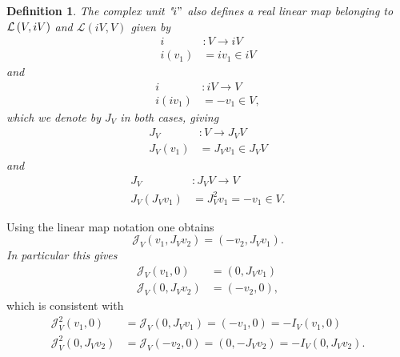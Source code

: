 \documentclass[aps,preprint]{revtex4}
\newtheorem{definition}[theorem]{Definition}
\begin{document}
\begin{definition}
The complex unit "$i"$ also defines a real linear map belonging to $\mathcal{%
L}\left( V,iV\right) $ and $\mathcal{L}\left( iV,V\right) $ given by 
\begin{align}
i& :V\rightarrow iV \\
i\left( v_{1}\right) & =iv_{1}\in iV
\end{align}%
and%
\begin{align}
i& :iV\rightarrow V \\
i\left( iv_{1}\right) & =-v_{1}\in V,
\end{align}%
which we denote by $J_{V}$ in both cases, giving 
\begin{align}
J_{V}& :V\rightarrow J_{V}V \\
J_{V}\left( v_{1}\right) & =J_{V}v_{1}\in J_{V}V
\end{align}%
and%
\begin{align}
J_{V}& :J_{V}V\rightarrow V \\
J_{V}\left( J_{V}v_{1}\right) & =J_{V}^{2}v_{1}=-v_{1}\in V.
\end{align}
\end{definition}

Using the linear map notation one obtains 
\begin{equation}
\mathcal{J}_{V}\left( v_{1},J_{V}v_{2}\right) =\left(
-v_{2},J_{V}v_{1}\right) .
\end{equation}%
\emph{In particular this gives} 
\begin{align}
\mathcal{J}_{V}\left( v_{1},0\right) & =\left( 0,J_{V}v_{1}\right) \\
\mathcal{J}_{V}\left( 0,J_{V}v_{2}\right) & =\left( -v_{2},0\right) ,
\end{align}%
which is consistent with 
\begin{align}
\mathcal{J}_{V}^{2}\left( v_{1},0\right) & =\mathcal{J}_{V}\left(
0,J_{V}v_{1}\right) =\left( -v_{1},0\right) =-I_{V}\left( v_{1},0\right) \\
\mathcal{J}_{V}^{2}\left( 0,J_{V}v_{2}\right) & =\mathcal{J}_{V}\left(
-v_{2},0\right) =\left( 0,-J_{V}v_{2}\right) =-I_{V}\left(
0,J_{V}v_{2}\right) .
\end{align}
\end{document}
